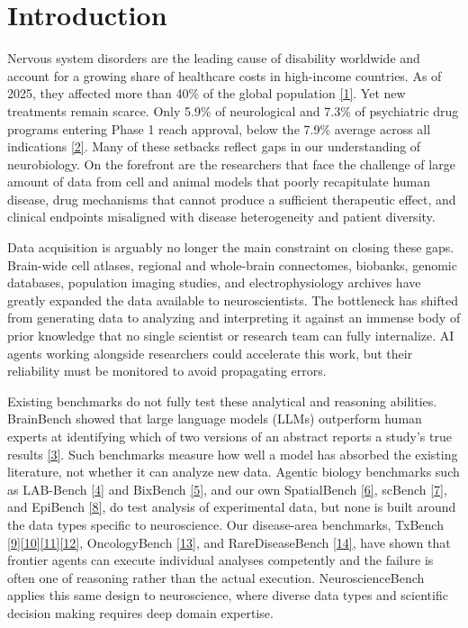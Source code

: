 \section*{Introduction}
Nervous system disorders are the leading cause of disability worldwide and account for a growing share of healthcare costs in high-income countries. As of 2025, they affected more than 40\% of the global population \href{https://www.who.int/publications/i/item/9789240116139}{[1]}. Yet new treatments remain scarce. Only 5.9\% of neurological and 7.3\% of psychiatric drug programs entering Phase 1 reach approval, below the 7.9\% average across all indications \href{https://www.bio.org/clinical-development-success-rates-and-contributing-factors-2011-2020}{[2]}. Many of these setbacks reflect gaps in our understanding of neurobiology. On the forefront are the researchers that face the challenge of large amount of data from cell and animal models that poorly recapitulate human disease, drug mechanisms that cannot produce a sufficient therapeutic effect, and clinical endpoints misaligned with disease heterogeneity and patient diversity.

Data acquisition is arguably no longer the main constraint on closing these gaps. Brain-wide cell atlases, regional and whole-brain connectomes, biobanks, genomic databases, population imaging studies, and electrophysiology archives have greatly expanded the data available to neuroscientists. The bottleneck has shifted from generating data to analyzing and interpreting it against an immense body of prior knowledge that no single scientist or research team can fully internalize. AI agents working alongside researchers could accelerate this work, but their reliability must be monitored to avoid propagating errors.

Existing benchmarks do not fully test these analytical and reasoning abilities. BrainBench showed that large language models (LLMs) outperform human experts at identifying which of two versions of an abstract reports a study's true results \href{https://doi.org/10.1038/s41562-024-02046-9}{[3]}. Such benchmarks measure how well a model has absorbed the existing literature, not whether it can analyze new data. Agentic biology benchmarks such as LAB-Bench \href{https://arxiv.org/abs/2407.10362}{[4]} and BixBench \href{https://arxiv.org/abs/2503.00096}{[5]}, and our own SpatialBench \href{https://arxiv.org/abs/2512.21907}{[6]}, scBench \href{https://arxiv.org/abs/2602.09063}{[7]}, and EpiBench \href{https://arxiv.org/abs/2606.13602}{[8]}, do test analysis of experimental data, but none is built around the data types specific to neuroscience. Our disease-area benchmarks, TxBench \href{https://arxiv.org/abs/2606.19245}{[9]}\href{https://latch.bio/txbench-ab}{[10]}\href{https://latch.bio/txbench-oligo}{[11]}\href{https://latch.bio/txbench-ab-dev}{[12]}, OncologyBench \href{https://benchmarks.bio/oncology}{[13]}, and RareDiseaseBench \href{https://benchmarks.bio/raredisease}{[14]}, have shown that frontier agents can execute individual analyses competently and the failure is often one of reasoning rather than the actual execution. NeuroscienceBench applies this same design to neuroscience, where diverse data types and scientific decision making requires deep domain expertise.
